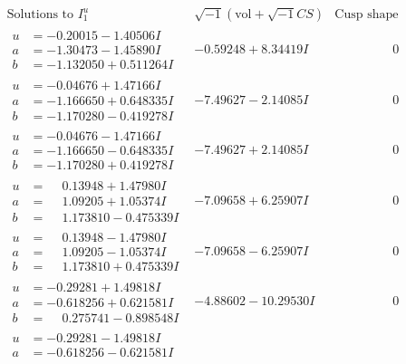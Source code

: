 \documentclass[1p]{elsarticle_modified}
\theoremstyle{definition}
\newcommand{\I}{\sqrt{-1}}
\begin{document}
$$\begin{array}{c|c|c}
\text{Solutions to }I^u_{1}& \I (\text{vol} + \sqrt{-1}CS) & \text{Cusp shape}\\
 \hline 
\begin{aligned}
u &= -0.20015 - 1.40506 I \\
a &= -1.30473 - 1.45890 I \\
b &= -1.132050 + 0.511264 I\end{aligned}
 & -0.59248 + 8.34419 I & \phantom{-0.000000 } 0 \\ \hline\begin{aligned}
u &= -0.04676 + 1.47166 I \\
a &= -1.166650 + 0.648335 I \\
b &= -1.170280 - 0.419278 I\end{aligned}
 & -7.49627 - 2.14085 I & \phantom{-0.000000 } 0 \\ \hline\begin{aligned}
u &= -0.04676 - 1.47166 I \\
a &= -1.166650 - 0.648335 I \\
b &= -1.170280 + 0.419278 I\end{aligned}
 & -7.49627 + 2.14085 I & \phantom{-0.000000 } 0 \\ \hline\begin{aligned}
u &= \phantom{-}0.13948 + 1.47980 I \\
a &= \phantom{-}1.09205 + 1.05374 I \\
b &= \phantom{-}1.173810 - 0.475339 I\end{aligned}
 & -7.09658 + 6.25907 I & \phantom{-0.000000 } 0 \\ \hline\begin{aligned}
u &= \phantom{-}0.13948 - 1.47980 I \\
a &= \phantom{-}1.09205 - 1.05374 I \\
b &= \phantom{-}1.173810 + 0.475339 I\end{aligned}
 & -7.09658 - 6.25907 I & \phantom{-0.000000 } 0 \\ \hline\begin{aligned}
u &= -0.29281 + 1.49818 I \\
a &= -0.618256 + 0.621581 I \\
b &= \phantom{-}0.275741 - 0.898548 I\end{aligned}
 & -4.88602 - 10.29530 I & \phantom{-0.000000 } 0 \\ \hline\begin{aligned}
u &= -0.29281 - 1.49818 I \\
a &= -0.618256 - 0.621581 I \\

\end{aligned}
\end{array}$$
\end{document}
